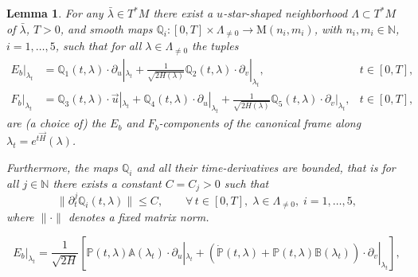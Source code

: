 \documentclass[10pt,a4paper]{amsart}
\newtheorem{lemma}{Lemma}
\newcommand{\A}{\mathbb{A}}
\newcommand{\B}{\mathbb{B}}
\newcommand{\N}{\mathbb{N}} %
\renewcommand{\P}{\mathbb{P}}
\newcommand{\Q}{\mathbb{Q}}
\begin{document}
\begin{lemma}\label{l:lemmaEbFb}
For any $\bar{\lambda}\in T^*M$ there exist a $u$-star-shaped neighborhood $\Lambda \subset T^*M$ of $\bar{\lambda}$, $T>0$, and smooth maps $\Q_i: [0,T]\times  \Lambda_{\neq 0} \to \mathrm{M}(n_i,m_i)$, with $n_i,m_i \in \N$, $i=1,\dots,5$, such that for all $\lambda \in \Lambda_{\neq 0}$ the tuples
\begin{align}
E_b|_{\lambda_t} & = \Q_1(t,\lambda)\cdot \partial_u|_{\lambda_t}  + \frac{1}{\sqrt{2H(\lambda)}}\Q_2(t,\lambda) \cdot \partial_v|_{\lambda_t} , & t\in [0,T],\\
F_b|_{\lambda_t} & = \Q_3(t,\lambda)\cdot \vec{u} |_{\lambda_t} + \Q_4(t,\lambda)\cdot\partial_u|_{\lambda_t}  + \frac{1}{\sqrt{2H(\lambda)}}\Q_5(t,\lambda)\cdot\partial_v|_{\lambda_t} ,  & t\in [0,T],
\end{align}
are (a choice of) the $E_b$ and $F_b$-components of the canonical frame along $\lambda_t = e^{t\vec{H}}(\lambda)$.

Furthermore, the maps $\Q_i$ and all their time-derivatives are bounded, that is for all $j\in \N$ there exists a constant $C = C_j>0$ such that
\begin{equation}
\|\partial_t^{j}\Q_i(t,\lambda)\| \leq C ,\qquad \forall\, t \in [0,T],\; \lambda \in \Lambda_{\neq 0},\; i=1,\dots,5,
\end{equation}
where $\|\cdot\|$ denotes a fixed matrix norm.
\end{lemma}

\begin{equation}\label{eq:Ebexplicit}
E_b|_{\lambda_t}  = \frac{1}{\sqrt{2H}} \left[ \P(t,\lambda)\A(\lambda_t) \cdot \partial_u|_{\lambda_t} +  (\dot{\P}(t,\lambda)+ \P(t,\lambda) \B(\lambda_t) )\cdot \partial_v|_{\lambda_t}\right],
\end{equation}
\end{document}
